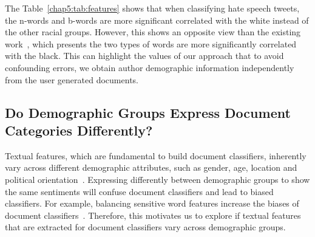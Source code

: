 \begin{table}[htp]
\centering
{}
\caption{Top 10 predictable features of race and gender.}
\label{chap5:tab:features}
\end{table}

The Table~\ref{chap5:tab:features} shows that when classifying hate speech tweets, the n-words and b-words are more significant correlated with the white instead of the other racial groups.
However, this shows an opposite view than the existing work~\cite{davidson2019racial}, which presents the two types of words are more significantly correlated with the black.
This can highlight the values of our approach that to avoid confounding errors, we obtain author demographic information independently from the user generated documents.


\subsection{Do Demographic Groups Express Document Categories Differently?}

Textual features, which are fundamental to build document classifiers, inherently vary across different demographic attributes, such as gender, age, location and political orientation~\cite{gao2015more,hinds2018demographic}.
Expressing differently between demographic groups to show the same sentiments will confuse document classifiers and lead to biased classifiers.
For example, balancing sensitive word features increase the biases of document classifiers~\cite{dixon2018measuring}.
Therefore, this motivates us to explore if textual features that are extracted for document classifiers vary across demographic groups.

